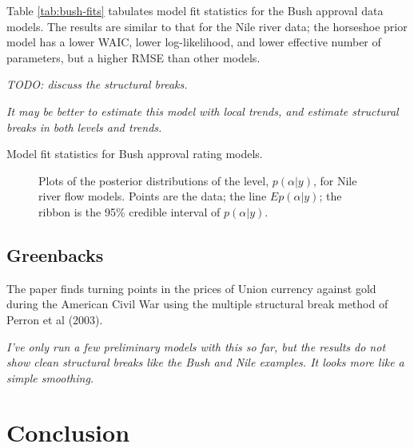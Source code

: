 \documentclass{article}
\begin{document}
Table \ref{tab:bush-fits} tabulates model fit statistics for the Bush approval data models. 
The results are similar to that for the Nile river data; the horseshoe prior model has a lower WAIC, lower log-likelihood, and lower effective number of parameters, but a higher RMSE than other models.

\textit{TODO: discuss the structural breaks.}

\textit{It may be better to estimate this model with local trends, and estimate structural breaks in both levels and trends.}

\begin{table}[htpb]
  \centering
  
  \caption{Model fit statistics for Bush approval rating models.}
  \label{tab:bush-fits}
\end{table}

\begin{figure}[htpb]
  \centering
  \begin{subfigure}{1.0\textwidth}
    \caption{}
    \label{fig:bush1}
  \end{subfigure}
  \begin{subfigure}{1.0\textwidth}
    \caption{}
    \label{fig:bush2}
  \end{subfigure}
  \caption{Plots of the posterior distributions of the level, $p(\alpha | y)$, for Nile river flow models. Points are the data; the line $E p(\alpha | y)$; the ribbon is the 95\% credible interval of $p(\alpha | y)$.}
  \label{fig:bush-posterior}
\end{figure}


\subsection{Greenbacks}
\label{sec:greenbacks}

The paper \textcite{WillardGuinnaneEtal1996} finds turning points in the prices of Union currency against gold during the American Civil War using the multiple structural break method of Perron et al (2003).

\textit{I've only run a few preliminary models with this so far, but the results do not show clean structural breaks like the Bush and Nile examples. It looks more like a simple smoothing.}


\section{Conclusion}
\label{sec:conclusion}
\end{document}
